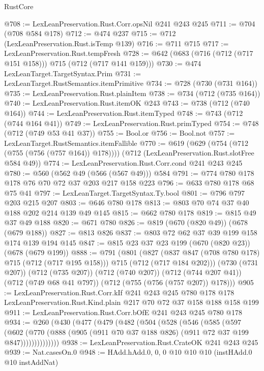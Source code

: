 \begin{lexlean}{RustCore}
\begin{coremodule}
@708 := LexLeanPreservation.Rust.Corr.opsNil @241 @243 @245
@711 := @704 (@708 @584 @178)
@712 := @474 @237
@715 := @712 (LexLeanPreservation.Rust.isTemp @139)
@716 := @711 @715
@717 := LexLeanPreservation.Rust.tempFresh
@728 := @642 (@683 (@716 (@712 (@717 @151 @158))) @715 (@712 (@717 @141 @159)))
@730 := @474 LexLeanTarget.TargetSyntax.Prim
@731 := LexLeanTarget.RustSemantics.itemPrimitive
@734 := @728 (@730 (@731 @164))
@735 := LexLeanPreservation.Rust.plainItem
@738 := @734 (@712 (@735 @164))
@740 := LexLeanPreservation.Rust.itemOK @243
@743 := @738 (@712 (@740 @164))
@744 := LexLeanPreservation.Rust.itemTyped
@748 := @743 (@712 (@744 @164 @41))
@749 := LexLeanPreservation.Rust.primTyped
@754 := @748 (@712 (@749 @53 @41 @37))
@755 := Bool.or
@756 := Bool.not
@757 := LexLeanTarget.RustSemantics.itemFallible
@770 := @619
    (@629 (@754 (@712 (@755 (@756 (@757 @164)) @178))))
    (@712 (LexLeanPreservation.Rust.slotFree @584 @49))
@774 := LexLeanPreservation.Rust.Corr.cond @241 @243 @245
@780 := @560 (@562 @49 (@566 (@567 @49))) @584
@791 := @774 @780 @178 @178 @76 @70 @72 @37 @203 @217 @158 @223
@796 := @633 @780 @178 @68 @75 @41
@797 := LexLeanTarget.TargetSyntax.Ty.bool
@801 := @796 @797 @203 @215 @207
@803 := @646 @780 @178
@813 := @803 @70 @74 @37 @40 @188 @202 @214 @139 @49 @145
@815 := @662 @780 @178
@819 := @815 @49 @37 @49 @188
@820 := @671 @780
@826 := @819 (@670 (@820 @49)) (@678 (@679 @188))
@827 := @813 @826
@837 := @803 @72 @62 @37 @39 @199 @158 @174 @139 @194 @145
@847 := @815 @23 @37 @23 @199 (@670 (@820 @23)) (@678 (@679 @199))
@888 := @791
    (@801
      (@827 (@837 @847 (@708 @780 @178) @715 (@712 (@717 @195 @158))) @715 (@712 (@717 @184 @202)))
      (@730 (@731 @207))
      (@712 (@735 @207))
      (@712 (@740 @207))
      (@712 (@744 @207 @41))
      (@712 (@749 @68 @41 @797))
      (@712 (@755 (@756 (@757 @207)) @178)))
@905 := LexLeanPreservation.Rust.Corr.kIf
    @241
    @243
    @245
    @780
    @178
    @178
    LexLeanPreservation.Rust.Kind.plain
    @217
    @70
    @72
    @37
    @158
    @188
    @158
    @199
@911 := LexLeanPreservation.Rust.Corr.bOfE @241 @243 @245 @780 @178
@934 := @260
    (@430
      (@477
        (@479
          (@482
            (@504
              (@528
                (@546
                  (@585
                    (@597
                      (@602
                        (@770
                          (@888 (@905 (@911 @70 @37 @188 @826) (@911 @72 @37 @199 @847))))))))))))))
@938 := LexLeanPreservation.Rust.CrateOK @241 @243 @245
@939 := Nat.casesOn.{0}
@948 := HAdd.hAdd.{0, 0, 0} @10 @10 @10 (instHAdd.{0} @10 instAddNat)

\end{coremodule}
\end{lexlean}

